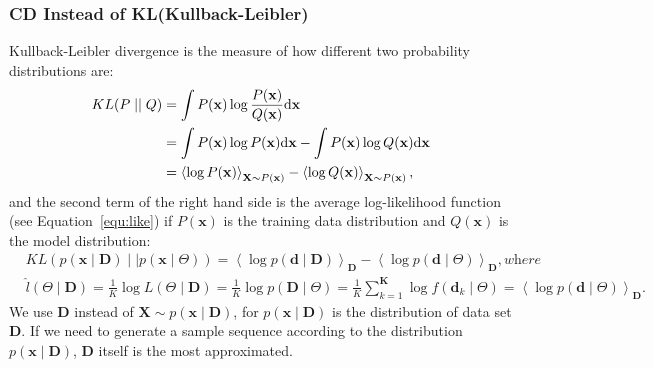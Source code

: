 \subsubsection{CD Instead of KL(Kullback-Leibler)}
\label{sec:CD}
	Kullback-Leibler divergence is the measure of how different two probability distributions are:
	\begin{equation}
	\begin{aligned}
	KL(P \mid \mid Q)
	&= \int P(\mathbf{x}) \log \frac{P(\mathbf{x})}{Q(\mathbf{x})} \mathrm{d} \mathbf{x}\\
	&= \int P(\mathbf{x}) \log P(\mathbf{x}) \mathrm{d} \mathbf{x} - \int P(\mathbf{x}) \log Q(\mathbf{x}) \mathrm{d} \mathbf{x}\\
	&= \left \langle \log P(\mathbf{x}) \right \rangle_{\mathbf{X} \sim P(\mathbf{x})} - \left \langle \log Q(\mathbf{x}) \right \rangle_{\mathbf{X} \sim P(\mathbf{x})} ,
	\end{aligned}
	\end{equation}
	and the second term of the right hand side is the average log-likelihood function (see Equation~\ref{equ:like}) if $P(\mathbf{x})$ is the training data distribution and $Q(\mathbf{x})$ is the model distribution:
	\begin{equation}
	\begin{aligned}
	& KL \left( p(\mathbf{x} \mid \mathbf{D}) \mid \mid p(\mathbf{x} \mid \Theta) \right)
	=   \left \langle \log p(\mathbf{d} \mid \mathbf{D}) \right \rangle_{\mathbf{D}} - \left \langle \log p(\mathbf{d} \mid \Theta) \right \rangle_{\mathbf{D}}, \textit{where} \\
	& \hat{l} (\Theta \mid \mathbf{D}) =\frac{1}{K}\log  L (\Theta \mid \mathbf{D}) 
	=  \frac{1}{K}\log p(\mathbf{D} \mid \Theta ) 
	= \frac{1}{K} \sum_{k=1}^{\mathbf{K}} \log f(\mathbf{d}_k \mid \Theta )
	= \left \langle \log p(\mathbf{d} \mid \Theta) \right \rangle_{\mathbf{D}}.
	\end{aligned}
	\end{equation}
	We use $ \mathbf{D} $ instead of $ \mathbf{X} \sim p(\mathbf{x} \mid \mathbf{D}) $, for $ p(\mathbf{x} \mid \mathbf{D}) $ is the distribution of data set $ \mathbf{D} $.
	If we need to generate a sample sequence according to the distribution $ p(\mathbf{x} \mid \mathbf{D}) $, $ \mathbf{D} $ itself is the most approximated.
